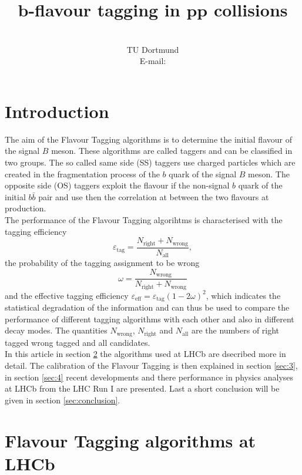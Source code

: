 \documentclass{PoS}
\title{$\bm{b}$-flavour tagging in $\bm{p\!p}$ collisions}
\author{\speaker{Alex Birnkraut}\\%
        TU Dortmund\\
        E-mail: \email{a.birnkraut@cern.ch}}
\begin{document}
\section{Introduction}\label{sec:1}

The aim of the Flavour Tagging algorithms is to determine the initial flavour of the signal $B$ meson. These algorithms are called taggers and can be classified in two groups. The so called same side (SS) taggers use charged particles which are created in the fragmentation process of the $b$ quark of the signal $B$ meson. The opposite side (OS) taggers exploit the flavour if the non-signal $b$ quark of the initial $b\bar{b}$ pair and use then the correlation at between the two flavours at production.\\
The performance of the Flavour Tagging algorihtms is characterised with the tagging efficiency
\begin{equation}
\varepsilon_\text{tag}=\frac{N_\text{right}+N_\text{wrong}}{N_\text{all}},
\end{equation}
the probability of the tagging assignment to be wrong
\begin{equation}
\omega=\frac{N_\text{wrong}}{N_\text{right}+N_\text{wrong}}
\end{equation}
and the effective tagging efficiency $\varepsilon_\text{eff}=\varepsilon_\text{tag}\left(1-2\omega\right)^2$, which indicates the statistical degradation of the information and can thus be used to compare the performance of different tagging algorithms with each other and also in different decay modes. The quantities $N_\text{wrong}$, $N_\text{right}$ and $N_\text{all}$ are the numbers of right tagged wrong tagged and all candidates. \\
In this article in section \ref{sec:2} the algorithms used at LHCb are dsecribed more in detail. The calibration of the Flavour Tagging is then explained in section \ref{sec:3}, in section \ref{sec:4} recent developments and there performance in physics analyses at LHCb from the LHC Run I are presented. Last a short conclusion will be given in section \ref{sec:conclusion}.

\section{Flavour Tagging algorithms at LHCb}\label{sec:2}
\end{document}
